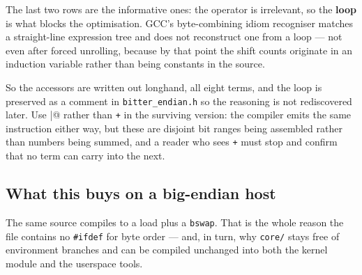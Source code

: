 The last two rows are the informative ones: the operator is irrelevant, so the
\textbf{loop} is what blocks the optimisation. GCC's byte-combining idiom
recogniser matches a straight-line expression tree and does not reconstruct one
from a loop --- not even after forced unrolling, because by that point the
shift counts originate in an induction variable rather than being constants in
the source.

So the accessors are written out longhand, all eight terms, and the loop is
preserved as a comment in \lstinline|bitter_endian.h| so the reasoning is not
rediscovered later. Use \lstinline@|@ rather than \lstinline|+| in the surviving
version: the compiler emits the same instruction either way, but these are
disjoint bit ranges being assembled rather than numbers being summed, and a
reader who sees \lstinline|+| must stop and confirm that no term can carry into
the next.

\subsection{What this buys on a big-endian host}

The same source compiles to a load plus a \lstinline|bswap|. That is the whole
reason the file contains no \lstinline|#ifdef| for byte order --- and, in turn,
why \lstinline|core/| stays free of environment branches and can be compiled
unchanged into both the kernel module and the userspace tools.
